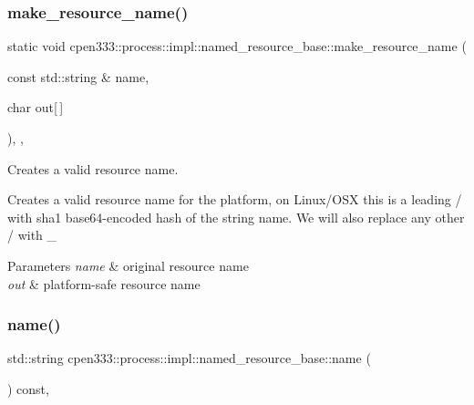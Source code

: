 \subsubsection{\texorpdfstring{make\+\_\+resource\+\_\+name()}{make\_resource\_name()}}
{\footnotesize\ttfamily static void cpen333\+::process\+::impl\+::named\+\_\+resource\+\_\+base\+::make\+\_\+resource\+\_\+name (\begin{DoxyParamCaption}\item[{const std\+::string \&}]{name,  }\item[{char}]{out\mbox{[}$\,$\mbox{]} }\end{DoxyParamCaption})\hspace{0.3cm}{\ttfamily [inline]}, {\ttfamily [static]}, {\ttfamily [protected]}}



Creates a valid resource name. 

Creates a valid resource name for the platform, on Linux/\+O\+SX this is a leading \textquotesingle{}/\textquotesingle{} with sha1 base64-\/encoded hash of the string name. We will also replace any other \textquotesingle{}/\textquotesingle{} with \textquotesingle{}\+\_\+\textquotesingle{} 
\begin{DoxyParams}{Parameters}
{\em name} & original resource name \\
\hline
{\em out} & platform-\/safe resource name \\
\hline
\end{DoxyParams}
\mbox{\label{classcpen333_1_1process_1_1impl_1_1named__resource__base_ae0c5fbb1843afe863cece4b51c38f807}} 
\subsubsection{\texorpdfstring{name()}{name()}}
{\footnotesize\ttfamily std\+::string cpen333\+::process\+::impl\+::named\+\_\+resource\+\_\+base\+::name (\begin{DoxyParamCaption}{ }\end{DoxyParamCaption}) const\hspace{0.3cm}{\ttfamily [inline]}, {\ttfamily [protected]}}



